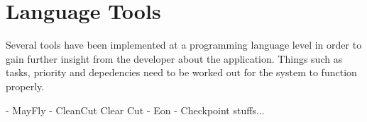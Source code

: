 \section{Language Tools} %
\label{sec:language_tools}

Several tools have been implemented at a programming language level in order to gain further insight from the developer about the application.
Things such as tasks, priority and depedencies need to be worked out for the system to function properly.


- MayFly \cite{mayfly}
- CleanCut   Clear Cut \cite{cleancut}
- Eon \cite{eon}
- Checkpoint stuffs...
